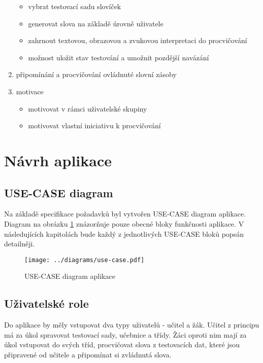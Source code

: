 \documentclass[a4paper,11pt,titlepage,fleqn]{article}
\begin{document}
\begin{enumerate}
\begin{itemize}
                    \item vybrat testovací sadu slovíček
                    \item generovat slova na základě úrovně uživatele
                    \item zahrnout textovou, obrazovou a zvukovou interpretaci do procvičování
                    \item možnost uložit stav testování a umožnit pozdější navázání
                \end{itemize}
            \item připomínání a procvičování ovládnuté slovní zásoby 
            \item motivace
                \begin{itemize}
                    \item motivovat v rámci uživatelské skupiny
                    \item motivovat vlastní iniciativu k procvičování
                \end{itemize}
        \end{enumerate}


\newpage
\section{Návrh aplikace}

    \subsection{USE-CASE diagram}
    Na základě specifikace požadavků byl vytvořen USE-CASE diagram aplikace. Diagram na obrázku \ref{fig:use-case} znázorňuje pouze obecné bloky funkčnosti aplikace. V následujících kapitolách bude každý z jednotlivých USE-CASE bloků popsán detailněji.

        \begin{figure}[ht!]
            \centering
            \texttt{[image: ../diagrams/use-case.pdf]}
            \caption{USE-CASE diagram aplikace}
            \label{fig:use-case}
        \end{figure}

    \subsection{Uživatelské role}
        Do aplikace by měly vstupovat dva typy uživatelů - učitel a žák. Učitel z principu má za úkol spravovat testovací sady, učebnice a třídy. Žáci oproti nim mají za úkol vstupovat do svých tříd, procvičovat slova z testovacích dat, které jsou připravené od učitele a připomínat si zvládnutá slova. 
\end{document}
